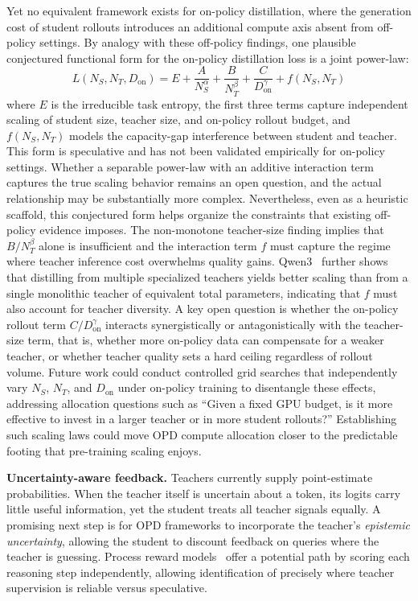\documentclass{article} %
\begin{document}
Yet no equivalent framework exists for on-policy distillation, where the generation cost of student rollouts introduces an additional compute axis absent from off-policy settings. By analogy with these off-policy findings, one plausible conjectured functional form for the on-policy distillation loss is a joint power-law:
\begin{equation*}
    L(N_S, N_T, D_{\text{on}}) = E + \frac{A}{N_S^\alpha} + \frac{B}{N_T^\beta} + \frac{C}{D_{\text{on}}^\gamma} + f(N_S, N_T)
\end{equation*}
where $E$ is the irreducible task entropy, the first three terms capture independent scaling of student size, teacher size, and on-policy rollout budget, and $f(N_S, N_T)$ models the capacity-gap interference between student and teacher. This form is speculative and has not been validated empirically for on-policy settings. Whether a separable power-law with an additive interaction term captures the true scaling behavior remains an open question, and the actual relationship may be substantially more complex. Nevertheless, even as a heuristic scaffold, this conjectured form helps organize the constraints that existing off-policy evidence imposes. The non-monotone teacher-size finding implies that $B/N_T^\beta$ alone is insufficient and the interaction term $f$ must capture the regime where teacher inference cost overwhelms quality gains. Qwen3~\citep{2505.09388} further shows that distilling from multiple specialized teachers yields better scaling than from a single monolithic teacher of equivalent total parameters, indicating that $f$ must also account for teacher diversity. A key open question is whether the on-policy rollout term $C/D_{\text{on}}^\gamma$ interacts synergistically or antagonistically with the teacher-size term, that is, whether more on-policy data can compensate for a weaker teacher, or whether teacher quality sets a hard ceiling regardless of rollout volume. Future work could conduct controlled grid searches that independently vary $N_S$, $N_T$, and $D_{\text{on}}$ under on-policy training to disentangle these effects, addressing allocation questions such as ``Given a fixed GPU budget, is it more effective to invest in a larger teacher or in more student rollouts?'' Establishing such scaling laws could move OPD compute allocation closer to the predictable footing that pre-training scaling enjoys.

\textbf{Uncertainty-aware feedback.} Teachers currently supply point-estimate probabilities. When the teacher itself is uncertain about a token, its logits carry little useful information, yet the student treats all teacher signals equally. A promising next step is for OPD frameworks to incorporate the teacher's \emph{epistemic uncertainty}, allowing the student to discount feedback on queries where the teacher is guessing. Process reward models~\citep{2305.20050} offer a potential path by scoring each reasoning step independently, allowing identification of precisely where teacher supervision is reliable versus speculative.
\end{document}
